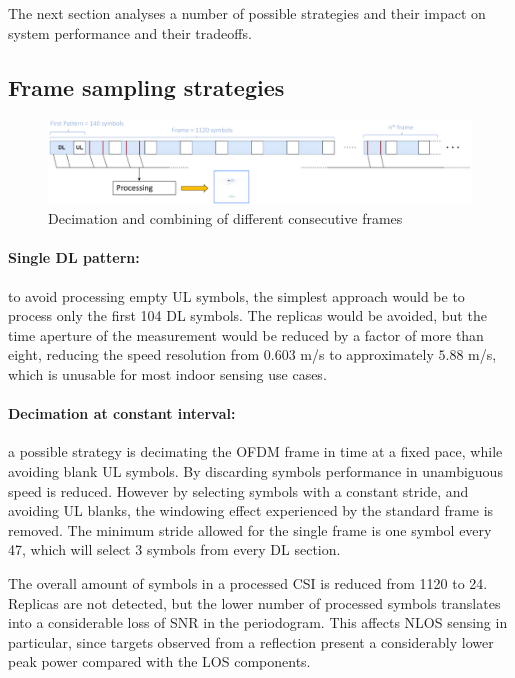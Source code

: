 			The next section analyses a number of possible strategies and their impact on system performance and their tradeoffs.    

	\subsection{Frame sampling strategies}

		    \begin{figure}[H]
		        \centering
		        \includegraphics[width=1\textwidth]{Images/TDDprocessing/TDDstrategies.eps}
		        \caption{Decimation and combining of different consecutive frames}
		        \label{fig:TDDstrategies}
		    \end{figure}
		
		    \paragraph{Single DL pattern:}
		    to avoid processing empty UL symbols, the simplest approach would be to process only the first 104 DL symbols. The replicas would be avoided, but the time aperture of the measurement would be reduced by a factor of more than eight, reducing the speed resolution from $0.603$ m/s to approximately $5.88$ m/s, which is unusable for most indoor sensing use cases.
		    
		    \paragraph{Decimation at constant interval:}
		     a possible strategy is decimating the OFDM frame in time at a fixed pace, while avoiding blank UL symbols. 
		     By discarding symbols performance in unambiguous speed is reduced. However by selecting symbols with a constant stride, and avoiding UL blanks, the windowing effect experienced by the standard frame is removed.
		     The minimum stride allowed for the single frame is one symbol every 47, which will select 3 symbols from every DL section.
		     
		     The overall amount of symbols in a processed CSI is reduced from 1120 to 24.
		     Replicas are not detected, but the lower number of processed symbols translates into a considerable loss of SNR in the periodogram. 
		     This affects NLOS sensing in particular, since targets observed from a reflection present a considerably lower peak power compared with the LOS components.
		
